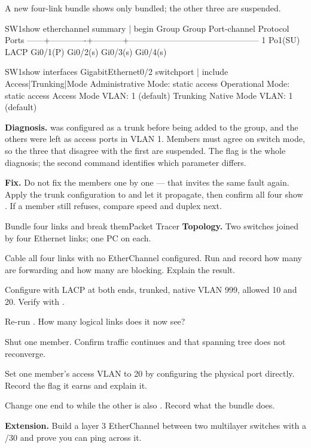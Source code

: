 \begin{breakfix}
A new four-link bundle shows only  bundled; the other three are
suspended.

\begin{verify}{SW1}{show etherchannel summary | begin Group}
Group  Port-channel  Protocol    Ports
------+-------------+-----------+-----------------------------------------------
1      Po1(SU)         LACP      Gi0/1(P)  Gi0/2(s)  Gi0/3(s)  Gi0/4(s)
\end{verify}

\begin{verify}{SW1}{show interfaces GigabitEthernet0/2 switchport | include Access|Trunking|Mode}
Administrative Mode: static access
Operational Mode: static access
Access Mode VLAN: 1 (default)
Trunking Native Mode VLAN: 1 (default)
\end{verify}

\textbf{Diagnosis.}  was configured as a trunk before being added to
the group, and the others were left as access ports in VLAN 1. Members must agree
on switch mode, so the three that disagree with the first are suspended. The
 flag is the whole diagnosis; the second command identifies which
parameter differs.

\textbf{Fix.} Do not fix the members one by one --- that invites the same fault
again. Apply the trunk configuration to  and let it
propagate, then confirm all four show . If a member still refuses,
compare speed and duplex next.
\end{breakfix}

\begin{lab}{Bundle four links and break them}{Packet Tracer}
\textbf{Topology.} Two switches joined by four Ethernet links; one PC on each.

\begin{tasks}
  \item Cable all four links with no EtherChannel configured. Run
         and record how many are forwarding and how many
        are blocking. Explain the result.
  \item Configure  with LACP  at both ends, trunked, native
        VLAN 999, allowed 10 and 20. Verify with .
  \item Re-run . How many logical links does it now see?
  \item Shut one member. Confirm traffic continues and that spanning tree does
        not reconverge.
  \item Set one member's access VLAN to 20 by configuring the physical port
        directly. Record the flag it earns and explain it.
  \item Change one end to  while the other is also .
        Record what the bundle does.
  \item \textbf{Extension.} Build a layer 3 EtherChannel between two multilayer
        switches with a /30 and prove you can ping across it.
\end{tasks}
\end{lab}

